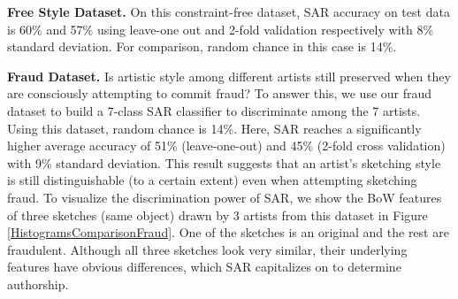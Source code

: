 \noindent\textbf{Free Style Dataset.} On this constraint-free dataset, SAR accuracy on test data is 60\% and 57\% using leave-one out and 2-fold validation respectively with 8\% standard deviation. For comparison, random chance in this case is 14\%.

\noindent\textbf{Fraud Dataset.} Is artistic style among different artists still preserved when they are consciously attempting to commit fraud? To answer this, we use our fraud dataset to build a 7-class SAR classifier to discriminate among the 7 artists. Using this dataset, random chance is 14\%. Here, SAR reaches a significantly higher average accuracy of 51\% (leave-one-out) and 45\% (2-fold cross validation) with 9\% standard deviation. This result suggests that an artist's sketching style is still distinguishable (to a certain extent) even when attempting sketching fraud. To visualize the discrimination power of SAR, we show the BoW features of three sketches (same object) drawn by 3 artists from this dataset in Figure \ref{HistogramsComparisonFraud}. One of the sketches is an original and the rest are fraudulent. Although all three sketches look very similar, their underlying features have obvious differences, which SAR capitalizes on to determine authorship.\\


